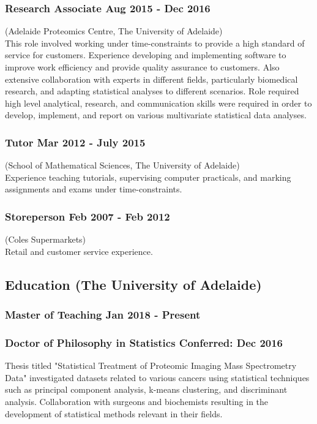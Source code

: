 \documentclass[a4paper,12pt]{report}
\begin{document}
\subsubsection*{Research Associate  \hfill Aug 2015 - Dec 2016} \vspace{-6pt}
(Adelaide Proteomics Centre, The University of Adelaide) \\[4pt]
This role involved working under time-constraints to provide a high standard of service for customers. Experience developing and implementing software to improve work efficiency and provide quality assurance to customers. Also extensive collaboration with experts in different fields, particularly biomedical research, and adapting statistical analyses to different scenarios. Role required high level analytical, research, and communication skills were required in order to develop, implement, and report on various multivariate statistical data analyses.

\subsubsection*{Tutor \hfill Mar 2012 - July 2015} \vspace{-6pt}
(School of Mathematical Sciences, The University of Adelaide) \\[4pt]
Experience teaching tutorials, supervising computer practicals, and marking assignments and exams under time-constraints.

\subsubsection*{Storeperson \hfill Feb 2007 - Feb 2012} \vspace{-6pt}
(Coles Supermarkets) \\[4pt]
Retail and customer service experience. \\

\subsection*{Education (The University of Adelaide)}

\subsubsection*{Master of Teaching \hfill Jan 2018 - Present}

\subsubsection*{Doctor of Philosophy in Statistics \hfill Conferred: Dec 2016} \vspace{-6pt}
Thesis titled "Statistical Treatment of Proteomic Imaging Mass Spectrometry Data" investigated datasets related to various cancers using statistical techniques such as principal component analysis, k-means clustering, and discriminant analysis. Collaboration with surgeons and biochemists resulting in the development of statistical methods relevant in their fields.
\end{document}
